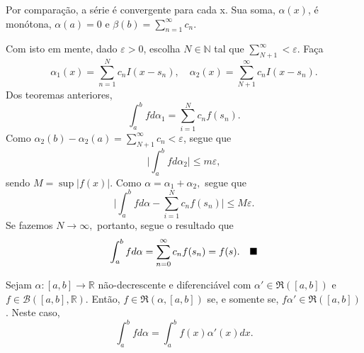 \documentclass[Analysis/analysis_notes.tex]{subfiles}
\begin{document}
\begin{proof*}
	Por comparação, a série é convergente para cada x. Sua soma, \(\alpha (x)\), é monótona, \(\alpha (a) = 0\) e \(\beta (b) = \sum\limits_{n=1}^{\infty}c_{n}.\)

	Com isto em mente, dado \(\varepsilon > 0\), escolha \(N\in \mathbb{N}\) tal que \(\sum\limits_{N+1}^{\infty} < \varepsilon \). Faça
	\[
		\alpha _1(x) = \sum\limits_{n=1}^{N}c_{n}I(x-s_{n}),\quad \alpha _2(x) = \sum\limits_{N+1}^{\infty}c_{n}I(x-s_{n}).
	\]
	Dos teoremas anteriores,
	\[
		\int_{a}^{b}fd\alpha_1 = \sum\limits_{i=1}^{N}c_{n}f(s_{n}).
	\]
	Como \(\alpha _2(b) - \alpha _2(a) = \sum\limits_{N+1}^{\infty}c_{n} < \varepsilon \), segue que
	\[
		\biggl\vert \int_{a}^{b}f d\alpha_2 \biggr\vert \leq m\varepsilon ,
	\]
	sendo \(M = \sup{|f(x)|}\). Como \(\alpha = \alpha _1 + \alpha _2, \) segue que
	\[
		\biggl\vert \int_{a}^{b}fd\alpha  - \sum\limits_{i=1}^{N}c_{n}f(s_{n}) \biggr\vert\leq M\varepsilon .
	\]
	Se fazemos \(N\to \infty,\) portanto, segue o resultado que
	\[
		\int_{a}^{b}f d\alpha = \sum\limits_{n=0}^{\infty}c_{n}f(s_{n}) = f(s).\quad \text{$\blacksquare$}
	\]
\end{proof*}
\begin{theorem*}
	Sejam \(\alpha :[a, b]\rightarrow \mathbb{R}\) não-decrescente e diferenciável com \(\alpha '\in \mathfrak{R}([a, b])\) e \(f\in \mathcal{B}([a, b], \mathbb{R})\). Então, \(f\in \mathfrak{R}(\alpha , [a, b])\) se, e somente se,
	\(f\alpha '\in \mathfrak{R}([a, b])\). Neste caso,
	\[
		\int_{a}^{b}fd\alpha = \int_{a}^{b}f(x)\alpha'(x) dx.
	\]
\end{theorem*}
\end{document}
